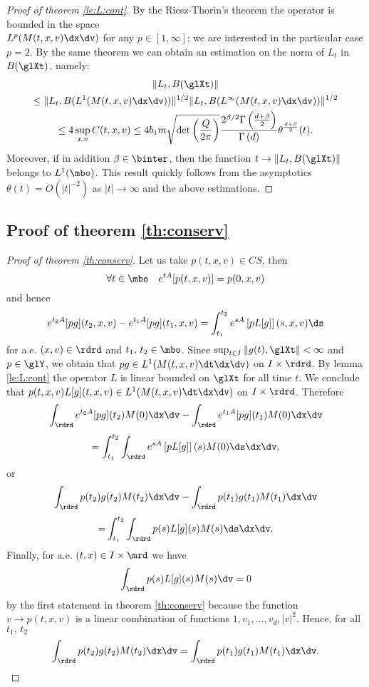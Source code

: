 \begin{subappendices}
\begin{proof}[Proof of theorem \ref{le:L:cont}]
	By the Riesz-Thorin's theorem the operator is bounded in the space\\ $L^p(M(t,x,v)\dx\dv)$ for any $p\in[1,\infty]$; we are interested in the particular case $p=2$. By the same theorem we can obtain an estimation on the norm of $L_t$ in $B(\glXt)$, namely:
	\begin{multline*}
			\|L_t,B(\glXt)\| \\
			\le\|L_t,B( L^1(M(t,x,v)\dx\dv))\|^{1/2}\|L_t,B( L^\infty(M(t,x,v)\dx\dv))\|^{1/2}
			\\\le 4  \sup_{x,v} C(t,x,v)
			\le 4b_1m \sqrt{\det\left(\frac{Q}{2 \pi }\right)} \frac{2^{\beta/2 }\Gamma\left(\frac{d+\beta}{2} \right)}{\Gamma\left( d \right)}\theta^{\frac{d +\beta}{2} }(t).
	\end{multline*}
	Moreover, if in addition $\beta \in \binter $, then the function $t\to \|L_t,B(\glXt)\|$ belongs to $L^1(\mbo)$. This result quickly follows from the asymptotics $\theta(t)=O(|t|^{-2})$ as $|t|\to \infty$ and the above estimations.
\end{proof}


\subsection{Proof of theorem
 \ref{th:conserv}} %
\label{sec:proof_of_theorems_conserv}
\begin{proof}[Proof of theorem \ref{th:conserv}]
	Let us take $p(t,x,v)\in CS$, then 
	\[\forall t\in \mbo \quad e^{tA}[p(t,x,v)] = p(0,x,v)\]
	and hence
	\[e^{t_2A}[pg](t_2,x,v)-e^{t_1A}[pg](t_1,x,v)=\int_{t_1}^{t_2}e^{sA}\left[p L[g ]\right](s,x,v)\ds\]
	for a.e. $(x,v)\in \rdrd$ and $t_1,\,t_2\in\mbo $. Since $\sup_{t\in I}\|g(t),\glXt\|<\infty$ and $p\in\glY$, we obtain that $pg\in L^1(M(t,x,v)\dt\dx\dv)$ on $I\times\rdrd$. By lemma \ref{le:L:cont} the operator $L$ is linear bounded on $\glXt$ for all time $t$. We conclude that $p(t,x,v)L[g](t,x,v)\in L^1(M(t,x,v)\dt\dx\dv)$ on $I\times\rdrd$. Therefore
	\[
	\int_{\rdrd} e^{t_2A}[pg](t_2)M(0)\dx\dv - \int_{\rdrd} e^{t_1A}[pg](t_1)M(0)\dx\dv \]\[= 
	\int_{t_1}^{t_2}\int_{\rdrd} e^{sA}\left[p L[g ]\right](s)M(0)\ds\dx\dv,
	\]
	or
	\[
	\int_{\rdrd}   p(t_2)g (t_2)M(t_2)\dx\dv - \int_{\rdrd}   p(t_1)g (t_1)M(t_1)\dx\dv \]\[{= }
	\int_{t_1}^{t_2}\int_{\rdrd}  p(s) L[g ] (s)M(s)\ds\dx\dv.
	\]
	Finally, for a.e. $(t,x)\in I\times\mrd$ we have \[
	\int_{\rdrd}  p(s) L[g ] (s)M(s) \dv=0\]
	by the first statement in theorem \ref{th:conserv} because the function $v\to p(t,x,v)$ is a linear combination of  functions $1,v_1,\ldots,v_d,|v|^2$. Hence,
	for all $t_1,\,t_2$
	\[
	\int_{\rdrd}   p(t_2)g (t_2)M(t_2)\dx\dv = \int_{\rdrd}   p(t_1)g (t_1)M(t_1)\dx\dv. \]


\end{proof}
\end{subappendices}
